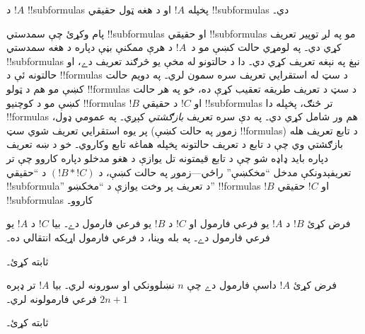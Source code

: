 \documentclass[../../../include/open-logic-section]{subfiles}
\begin{document}
\begin{defn}[!!^{subformula}]
د $!A$ !!{subformula}s پخپله $!A$ او د هغه ټول حقيقي
!!{subformula}s دي۔
\end{defn}

\begin{explain}
پام وکړئ چې سمدستي !!{subformula}s او حقيقي !!{subformula}s مو په
لږ توپير تعريف کړي دي۔ په لومړي حالت کښې مو د~$!A$ د هرې ممکنې بڼې
دپاره د هغه سمدستي !!{subformula}s نېغ په نېغه تعريف کړي دي۔ دا د
حالتونو له مخې يو څرګند تعريف دے، او حالتونه ئې د !!{formula}s د سټ
له استقرايي تعريف سره سمون لري۔ په دويم حالت کښې مو هم د ټولو
!!{formula}s د سټ د تعريف طريقه تعقيب کړې ده، خو په هر حالت کښې مو د
کوچنيو !!{formula}s $!B$ او $!C$ د حقيقي !!{subformula}s تر څنګ،
پخپله دا !!{formula}s هم ور شامل کړي دي۔ په دې سره تعريف \emph{بازګشتي}
کېږي۔ په عمومي ډول، پر يوه استقرايي تعريف شوي سټ (زموږ په حالت کښې
!!{formula}s) د تابع تعريف هله بازګشتي وي چې د تابع د تعريف حالتونه
پخپله هماغه تابع وکاروي۔ خو د ښه تعريف دپاره بايد ډاډه شو چې د تابع
قيمتونه تل يوازې د هغو مدخلو دپاره کاروو چې تر تعريفېدونکې مدخل
``مخکښې'' راځي---زموږ په حالت کښې، د $(!B \ast !C)$ د ``حقيقي
!!{subformula}'' د تعريف پر وخت يوازې د ``مخکښو'' !!{formula}s $!B$
او $!C$ حقيقي !!{subformula}s کاروو۔
\end{explain}

\begin{prop}
فرض کړئ $!B$ د $!A$ يو فرعي فارمول او $!C$ د $!B$ يو فرعي فارمول
دے۔ بيا $!C$ د $!A$ يو فرعي فارمول دے۔ په بله وينا، د فرعي فارمول
اړيکه انتقالي ده۔
\end{prop}

\begin{prob}
 ثابته کړئ۔
\end{prob}

\begin{prop}
فرض کړئ $!A$ داسې فارمول دے چې $n$ نښلوونکي او سورونه لري۔ بيا $!A$
تر ډېره $2n+1$ فرعي فارمولونه لري۔
\end{prop}

\begin{prob}
 ثابته کړئ۔
\end{prob}
\end{document}
